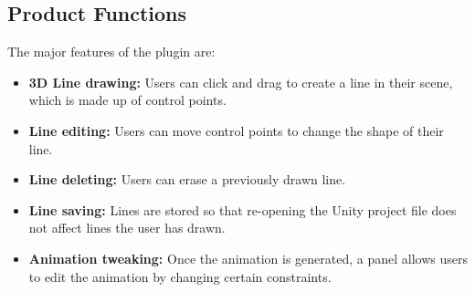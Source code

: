 \subsection{Product Functions}
The major features of the plugin are:

\begin{itemize}
\item \textbf{3D Line drawing:} 
Users can click and drag to create a line in their scene, which is made up of control points.

\item \textbf{Line editing:} 
Users can move control points to change the shape of their line.

\item \textbf{Line deleting:}
Users can erase a previously drawn line.

\item \textbf{Line saving:}
Lines are stored so that re-opening the Unity project file does not affect lines the user has drawn.

\item \textbf{Animation tweaking:}
Once the animation is generated, a panel allows users to edit the animation by changing certain constraints.

\end{itemize}
